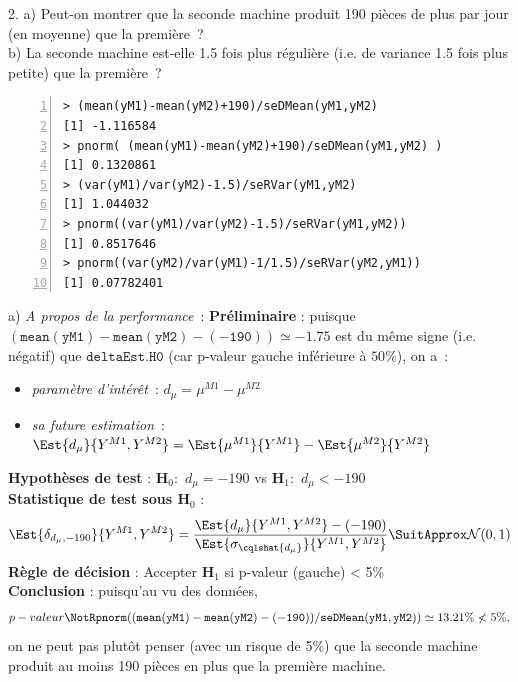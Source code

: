 \documentclass[10pt]{report}
\begin{document}
\begin{exercice}
 
2. a) Peut-on montrer que la seconde machine produit 190 pi{\`e}ces de plus par jour (en moyenne) que la premi{\`e}re~?  \\

b) La seconde machine est-elle 1.5 fois plus r{\'e}guli{\`e}re (i.e. de variance 1.5 fois plus petite) que la premi{\`e}re~? \\

\begin{Verbatim}[frame=leftline,fontfamily=tt,fontshape=n,numbers=left]
> (mean(yM1)-mean(yM2)+190)/seDMean(yM1,yM2)
[1] -1.116584
> pnorm( (mean(yM1)-mean(yM2)+190)/seDMean(yM1,yM2) )
[1] 0.1320861
> (var(yM1)/var(yM2)-1.5)/seRVar(yM1,yM2)
[1] 1.044032
> pnorm((var(yM1)/var(yM2)-1.5)/seRVar(yM1,yM2))
[1] 0.8517646
> pnorm((var(yM2)/var(yM1)-1/1.5)/seRVar(yM2,yM1))
[1] 0.07782401
\end{Verbatim}



\begin{Correction}
\noindent a) \textit{A propos de la performance}~:
\noindent \textbf{Préliminaire} : puisque $\mathtt{(mean(yM1)-mean(yM2)-(-190))}\simeq-1.75$ est du même signe (i.e. négatif) que $\mathtt{deltaEst.H0}$ (car p-valeur gauche inférieure à $50\%$), on a~: 
      \begin{itemize}
\item \textit{paramètre d'intérêt}~: $d_\mu=\mu^{M1}-\mu^{M2}$
\item \textit{sa future estimation}~: $\Est{d_\mu}{Y^{M1},Y^{M2}}=\Est{\mu^{M1}}{Y^{M1}}-\Est{\mu^{M2}}{Y^{M2}}$
\end{itemize}
\noindent \textbf{Hypothèses de test} : $\mathbf{H}_0:$ $d_\mu=-190$ vs {\large $\mathbf{H}_1:$ $d_\mu<-190$}\\
\textbf{Statistique de test sous $\mathbf{H}_0$} :
  $$
  \Est{\delta_{d_\mu,-190}}{Y^{M1},Y^{M2}}= {\displaystyle \frac{\Est{d_\mu}{Y^{M1},Y^{M2}}-(-190)}{
\Est{\sigma_{\cqlshat{d_\mu}}}{Y^{M1},Y^{M2}}
}} 
  \SuitApprox \mathcal{N}(0,1)
  $$
\textbf{Règle de décision} : Accepter $\mathbf{H}_1$ si 
  p-valeur (gauche) < 5\%\\
\noindent \textbf{Conclusion} :
puisqu'au vu des données, 
  \[
p-valeur\NotR\mathtt{pnorm((mean(yM1)-mean(yM2)-(-190))/seDMean(yM1,yM2))} \simeq 13.21\%\nless5\%,
\]
on ne peut pas plutôt penser (avec un risque de 5\%) que la seconde machine produit au moins 190 pièces en plus que la première machine.


\end{Correction}
\end{exercice}
\end{document}
